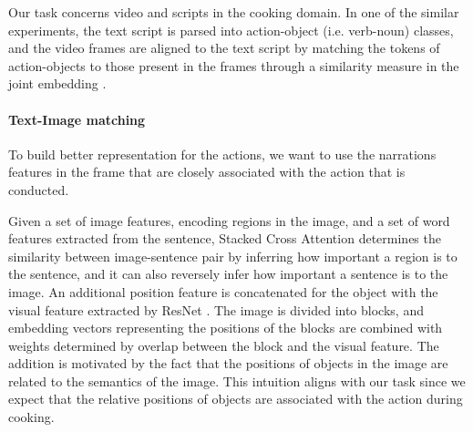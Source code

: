 Our task concerns video and scripts in the cooking domain. In one of the similar experiments, the text script is parsed into action-object (i.e. verb-noun) classes, and the video frames are aligned to the text script by matching the tokens of action-objects to those present in the frames through a similarity measure in the joint embedding \cite{malmaud-etal-2015-whats}.

\paragraph{Text-Image matching}
To build better representation for the actions, we want to use the narrations features in the frame that are closely associated with the action that is conducted.


Given a set of image features, encoding regions in the image, and a set of word features extracted from the sentence, Stacked Cross Attention \cite{lee2018stacked} determines the similarity between image-sentence pair by inferring how important a region is to the sentence, and it can also reversely infer how important a sentence is to the image. An additional position feature is concatenated for the object with the visual feature extracted by ResNet \cite{wang2019position}. The image is divided into blocks, and embedding vectors representing the positions of the blocks are combined with weights determined by overlap between the block and the visual feature. The addition is motivated by the fact that the positions of objects in the image are related to the semantics of the image. This intuition aligns with our task since we expect that the relative positions of objects are associated with the action during cooking.